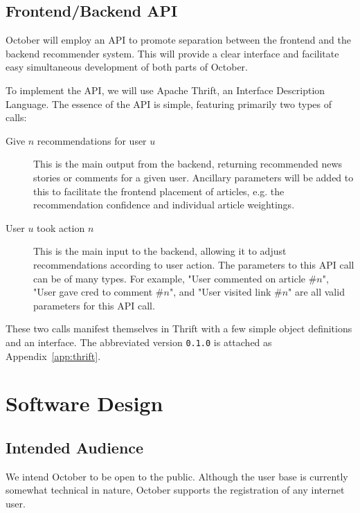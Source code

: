 \documentclass[11pt,letterpaper]{article}
\begin{document}
\subsection{Frontend/Backend API}
\label{sec:api}
October will employ an API to promote separation between the frontend and the backend recommender system.
This will provide a clear interface and facilitate easy simultaneous development of both parts of October.

To implement the API, we will use Apache Thrift, an Interface Description Language\cite{thrift}.
The essence of the API is simple, featuring primarily two types of calls:
\begin{description}
\item[Give $n$ recommendations for user $u$]
This is the main output from the backend, returning recommended news stories or comments for a given user.
Ancillary parameters will be added to this to facilitate the frontend placement of articles, e.g. the recommendation confidence and individual article weightings.
\item[User $u$ took action $n$]
This is the main input to the backend, allowing it to adjust recommendations according to user action.
The parameters to this API call can be of many types. For example, "User commented on article \#$n$", "User gave cred to comment \#$n$", and "User visited link \#$n$" are all valid parameters for this API call.
\end{description}

These two calls manifest themselves in Thrift with a few simple object
definitions and an interface.  The abbreviated version \texttt{0.1.0} is
attached as Appendix~\ref{app:thrift}.

\section{Software Design}

\subsection{Intended Audience}
We intend October to be open to the public.
Although the user base is currently somewhat technical in nature, October supports the registration of any internet user.
\end{document}
